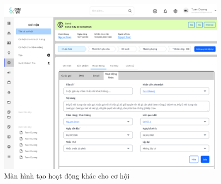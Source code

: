 \documentclass[12pt,a4paper]{article}
\begin{document}
\begin{enumerate}
\begin{itemize}
            \begin{figure}[H]
                \centering \includegraphics[width=\textwidth]{Img/Nguyet/Cohoi/hoatdongkhaccohoi.png}
                \vspace{0.5cm}
                \caption{Màn hình tạo hoạt động khác cho cơ hội }
                \label{hdkhaccohoi}
            \end{figure}


\end{itemize}
\end{enumerate}
\end{document}
